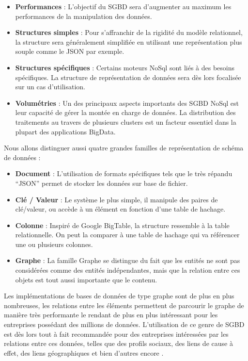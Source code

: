 \documentclass[a4paper,fleqn,12pt,oneside]{report}
\begin{document}
\begin{itemize}
\item \textbf{Performances} : L'objectif du SGBD sera d'augmenter au maximum les performances de la manipulation des données. 
\item \textbf{Structures simples} : Pour s’affranchir de la rigidité du modèle relationnel, la structure sera généralement simplifiée en utilisant une représentation plus souple comme le JSON par exemple.
\item \textbf{Structures spécifiques} : Certains moteurs NoSql sont liés à des besoins spécifiques. La structure de représentation de données sera dès lors focalisée sur un cas d'utilisation.
\item \textbf{Volumétries} : Un des principaux aspects importants des SGBD NoSql est leur capacité de gérer la montée en charge de données. La distribution des traitements au travers de plusieurs clusters est un facteur essentiel dans la plupart des applications BigData.
\end{itemize} 

Nous allons distinguer aussi quatre grandes familles de représentation de schéma de données :

\begin{itemize}
\item \textbf{Document} : L'utilisation de formats spécifiques tels que le très répandu \enquote{JSON} permet de stocker les données sur base de fichier.
\item \textbf{Clé / Valeur }: Le système le plus simple, il manipule des paires de clé/valeur, ou accède à un élément en fonction d'une table de hachage.
\item \textbf{Colonne} : Inspiré de Google BigTable, la structure ressemble à la table relationnelle. On peut la comparer à une table de hachage qui va référencer une ou plusieurs colonnes.
\item \textbf{Graphe} : La famille Graphe se distingue du fait que les entités ne sont pas considérées comme des entités indépendantes, mais que la relation entre ces objets est tout aussi importante que le contenu.
\end{itemize} 

Les implémentations de bases de données de type graphe sont de plus en plus nombreuses, les relations entre les éléments permettent de parcourir le graphe de manière très performante \cite{vicknair2010comparison} le rendant de plus en plus intéressant pour les entreprises possédant des millions de données. L'utilisation de ce genre de SGBD est dès lors tout à fait recommandée pour des entreprises intéressées par les relations entre ces données, telles que des profils sociaux, des liens de cause à effet, des liens géographiques et bien d’autres encore \cite{infoqSite}\cite{NoSqlDef}\cite{bruchez2016bases}.
\end{document}
